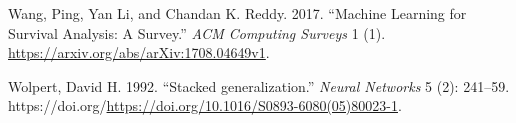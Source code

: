 \documentclass[
  letterpaper,
]{scrbook}
\newlength{\cslhangindent}
\newlength{\cslentryspacingunit} %
\newenvironment{CSLReferences}[2] %
 {%
  \setlength{\parindent}{0pt}
  \ifodd #1
  \let\oldpar\par
  \def\par{\hangindent=\cslhangindent\oldpar}
  \fi
  \setlength{\parskip}{#2\cslentryspacingunit}
 }%
 {}
\theoremstyle{plain}
\theoremstyle{definition}
\theoremstyle{remark}
\begin{document}
\begin{CSLReferences}{1}{0}
\leavevmode{}%
Wang, Ping, Yan Li, and Chandan K. Reddy. 2017. {``{Machine Learning for
Survival Analysis: A Survey}.''} \emph{ACM Computing Surveys} 1 (1).
\url{https://arxiv.org/abs/arXiv:1708.04649v1}.

\leavevmode{}%
Wolpert, David H. 1992. {``{Stacked generalization}.''} \emph{Neural
Networks} 5 (2): 241--59.
https://doi.org/\url{https://doi.org/10.1016/S0893-6080(05)80023-1}.

\end{CSLReferences}

\appendix
{}

\hypertarget{section}{%
\chapter{}\label{section}}


\backmatter

\printindex
\end{document}
